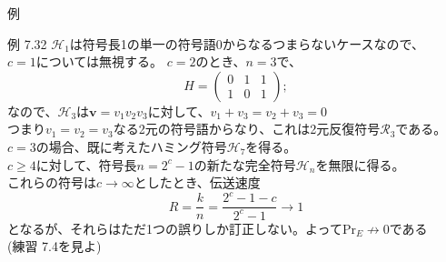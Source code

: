 \documentclass[dvipdfmx,10pt,jsarticle]{beamer}
\newcommand{\code}[1]{\mathcal{#1}}
\renewcommand{\vec}[1]{\mathbf{#1}}
\begin{document}
  \begin{frame}{例}
    \begin{block}{例 7.32}
      $\code{H}_1$は符号長1の単一の符号語$0$からなるつまらないケースなので、\\
      $c=1$については無視する。 $c=2$のとき、$n=3$で、
      \[ H = \begin{pmatrix}
          0 & 1 & 1 \\
          1 & 0 & 1
      \end{pmatrix}; \]
      なので、$\code{H}_3$は$\vec{v} = v_1 v_2 v_3$に対して、$v_1 + v_3 = v_2 + v_3 = 0$\\
      つまり$v_1 = v_2 = v_3$なる2元の符号語からなり、これは2元反復符号$\code{R}_3$である。\\
      $c = 3$の場合、既に考えたハミング符号$\code{H}_7$を得る。 \\
      $c \geq 4$に対して、符号長$n = 2^c - 1$の新たな完全符号$\code{H}_n$を無限に得る。 \\
      これらの符号は$c \rightarrow \infty$としたとき、伝送速度
      \[ R = \frac kn = \frac{2^c - 1 - c}{2^c - 1} \rightarrow 1 \]
      となるが、それらはただ1つの誤りしか訂正しない。よって$\text{Pr}_E \not\rightarrow 0$である\\
      (練習 7.4を見よ)
    \end{block}
  \end{frame}
\end{document}
